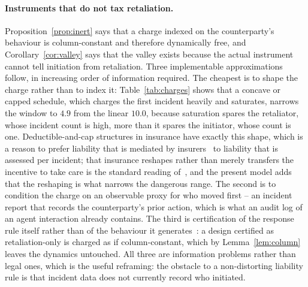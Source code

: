 \documentclass[pdflatex]{sn-jnl}
\theoremstyle{thmstyleone}
\theoremstyle{thmstylethree}
\theoremstyle{thmstyletwo}
\begin{document}
\paragraph{Instruments that do not tax retaliation.}
Proposition~\ref{prop:inert} says that a charge indexed on the counterparty's
behaviour is column-constant and therefore dynamically free, and
Corollary~\ref{cor:valley} says that the valley exists because the actual
instrument cannot tell initiation from retaliation. Three implementable
approximations follow, in increasing order of information required. The
cheapest is to shape the charge rather than to index it: Table~\ref{tab:charges}
shows that a concave or capped schedule, which charges the first incident
heavily and saturates, narrows the window to $4.9$ from the linear $10.0$,
because saturation spares the retaliator, whose incident count is high, more
than it spares the initiator, whose count is one. Deductible-and-cap
structures in insurance have exactly this shape, which is a reason to prefer
liability that is mediated by insurers~\citep{lior2022insuring,trout2025insurance} to liability
that is assessed per
incident; that insurance reshapes rather than merely transfers the incentive
to take care is the standard reading of~\citet{shavell1982insurance}, and the
present model adds that the reshaping is what narrows the dangerous range. The
second is to condition the charge on an observable proxy for who
moved first -- an incident report that records the counterparty's prior
action, which is what an audit log of an agent interaction already contains.
The third is certification of the response rule itself rather than of the
behaviour it generates~\citep{cihon2021certification}: a design certified as
retaliation-only is charged as if column-constant, which by
Lemma~\ref{lem:column} leaves the dynamics untouched. All three are
information problems rather than legal ones, which is the useful reframing:
the obstacle to a non-distorting liability rule is that incident data does not
currently record who initiated.
\end{document}
